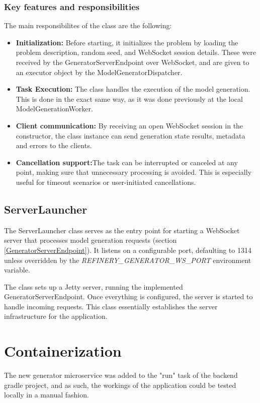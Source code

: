 		\subsubsection{Key features and responsibilities}\label{Key features and responsibilites}
			The main responsibilites of the class are the following:
			\begin{itemize}
				\item \textbf{Initialization:} Before starting, it initializes the problem by loading the problem description, random seed, and WebSocket session details. These were
				received by the GeneratorServerEndpoint over WebSocket, and are given to an executor object by the ModelGeneratorDispatcher.
				\item \textbf{Task Execution:} The class handles the execution of the model generation. This is done in the exact same way, as it was done previously at the local ModelGenerationWorker.
				\item \textbf{Client communication:} By receiving an open WebSocket session in the constructor, the class instance can send generation 
				state results, metadata and errors to the clients.
				\item \label{serverexecutorcancel}\textbf{Cancellation support:}The task can be interrupted or canceled at any point, 
				making sure that unnecessary processing is avoided. This is especially useful for timeout scenarios or user-initiated cancellations.
			\end{itemize}

		\subsection{ServerLauncher}\label{Serverlauncher}
		The ServerLauncher class serves as the entry point for starting a WebSocket server that 
		processes model generation requests (section \ref{GeneratorServerEndpoint}). It listens on a configurable port, defaulting to 1314 
		unless overridden by the \textit{REFINERY\_GENERATOR\_WS\_PORT} environment variable. 
		
		The class sets up a Jetty server, running the implemented GeneratorServerEndpoint.
		Once everything is configured, the server is started to handle incoming requests. 
		This class essentially establishes the server infrastructure for the application.

	\section{Containerization}\label{Containerization}
		The new generator microservice was added 
		to the "run" task of the backend gradle project, and as such, the workings of the application could be tested locally in a manual fashion. 
		
